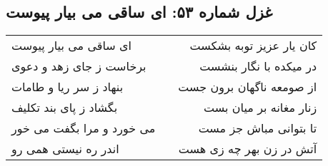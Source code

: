 \begin{center}
\section*{غزل شماره ۵۳: ای ساقی می بیار پیوست}
\label{sec:053}
\begin{longtable}{l p{0.5cm} r}
ای ساقی می بیار پیوست
&&
کان یار عزیز توبه بشکست
\\
برخاست ز جای زهد و دعوی
&&
در میکده با نگار بنشست
\\
بنهاد ز سر ریا و طامات
&&
از صومعه ناگهان برون جست
\\
بگشاد ز پای بند تکلیف
&&
زنار مغانه بر میان بست
\\
می خورد و مرا بگفت می خور
&&
تا بتوانی مباش جز مست
\\
اندر ره نیستی همی رو
&&
آتش در زن بهر چه زی هست
\\
\end{longtable}
\end{center}
